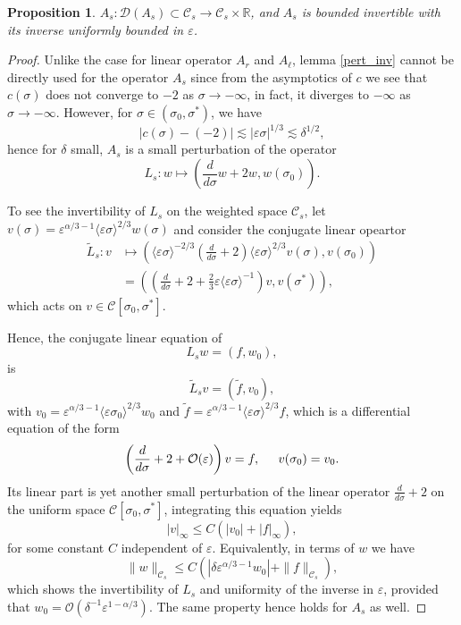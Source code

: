 \documentclass[letterpaper,11pt]{article}
\newcommand{\rmO}{\mathcal{O}}
\newcommand{\eps}{\varepsilon}
\newcommand{\lar}{ \lesssim }
\numberwithin{equation}{section}
\theoremstyle{plain}
\newtheorem{proposition}[theorem]{Proposition}
\begin{document}
\begin{proposition}\label{inv_A_s}
$A_s : \mathcal{D}(A_s) \subset \mathcal{C}_s \to \mathcal{C}_s \times \mathbb{R}$, and $A_s$ is bounded invertible with its inverse uniformly bounded in $\eps$.
\end{proposition}
\begin{proof}Unlike the case for linear operator $A_r$ and $A_\ell$, lemma \ref{pert_inv} cannot be directly used for the operator $A_s$ since from the asymptotics of $c$ we see that $c(\sigma)$ does not converge to $-2$ as $\sigma \to -\infty$, in fact, it diverges to $-\infty$ as $\sigma \to -\infty$. 
However, for $\sigma \in (\sigma_0, \sigma^*)$, we have
\[
|c(\sigma) - (-2) | \lar |\eps\sigma|^{1/3} \lar \delta^{1/2},
\]
hence for $\delta$ small, $A_s$ is a small perturbation of the operator
\[
L_s : w \mapsto \left( \frac{d}{d\sigma}w+2w, w(\sigma_0)\right).
\]

To see the invertibility of $L_s$ on the weighted space $\mathcal{C}_s$, let $v(\sigma) = \eps^{\alpha/3-1}\langle \eps \sigma \rangle^{2/3}w(\sigma)$ and consider the conjugate linear opeartor
\begin{align*}
\tilde{L}_s: v &\mapsto \left( \langle \eps \sigma \rangle^{-2/3}\left(\frac{d}{d\sigma} + 2\right) \langle \eps \sigma \rangle^{2/3} v(\sigma), v(\sigma_0) \right)\\
&= \left( \left(\frac{d}{d\sigma}+2+\frac{2}{3}\eps\langle \eps\sigma \rangle^{-1}\right)  v, v(\sigma^*) \right),
\end{align*}
which acts on $v \in \mathcal{C}[\sigma_0, \sigma^*]$. 

Hence, the conjugate linear equation of 
\[
L_s w = (f,w_0),
\]
is 
\[
\tilde{L}_s v = (\tilde{f}, v_0),
\]
with $v_0 = \eps^{\alpha/3-1}\langle \eps \sigma_0 \rangle^{2/3} w_0$ and $\tilde{f} = \eps^{\alpha/3-1}\langle \eps \sigma \rangle^{2/3}f$, which is a differential equation of the form
\[
\left( \frac{d}{d\sigma}+2+\rmO(\eps) \right) v =f, \hspace{0.2in} v(\sigma_0) = v_0.
\]
Its linear part is yet another small perturbation of the linear operator $\frac{d}{d\sigma}+2$ on the uniform space $\mathcal{C}[\sigma_0, \sigma^*]$, integrating this equation yields
\[
|v|_\infty \le C(|v_0|+|f|_\infty),
\]
for some constant $C$ independent of $\eps$. Equivalently, in terms of $w$ we have
\[
\|w\|_{\mathcal{C}_s} \le C(|\delta \eps^{\alpha/3-1}w_0|+ \|f\|_{\mathcal{C}_s}),
\]
which shows the invertibility of $L_s$ and uniformity of the inverse in $\eps$, provided that $w_0 = \rmO(\delta^{-1} \eps^{1-\alpha/3})$. The same property hence holds for $A_s$ as well.
\end{proof}
\end{document}
